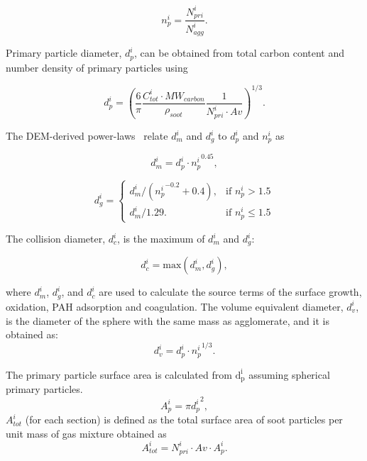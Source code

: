 \begin{equation}
	n^i_p = \frac{N^i_{pri}}{N^i_{agg}}
	\label{eqn:n_p}.
\end{equation}

 Primary particle diameter, ${d^i_p}$, can be obtained from total carbon content and number density of primary particles using

\begin{equation}
	d^i_p = \left(\frac{6}{\pi} \frac{C^i_{tot}\cdot MW_{carbon}}{\rho_{soot}} \frac{1}{N^i_{pri}\cdot Av} \right)^{1/3}.
	\label{eqn:d_p}
\end{equation}

 The DEM-derived power-laws~\citep{Kelesidis2017} relate ${d^i_m}$ and ${d^i_g}$ to ${d^i_p}$ and ${n^i_p}$ as

\begin{equation}
	d^i_{m} = d^i_p\cdot {n^i_p}^{0.45}
	\label{eqn:d_m},
\end{equation}

\begin{equation}
	d^i_g = 
	\left\{
	\begin{array}{lr}
		d^i_m/({n^i_p}^{-0.2}+0.4), & \text{if } n^i_p > 1.5\\
		d^i_m/1.29. & \text{if } n^i_p\leq 1.5
	\end{array}
	\right.
	\label{eqn:d_g}
\end{equation}

 The collision diameter, ${d^i_c}$, is the maximum of ${d^i_{m}}$ and ${d^i_{g}}$:

\begin{equation}
	d^i_c = \mathrm{max}\left(d^i_m, d^i_g\right),
	\label{eqn:d_c}
\end{equation}

   \noindent where ${d^i_{m}}$, ${d^i_{g}}$, and ${d^i_{c}}$ are used to calculate the source terms of the surface growth, oxidation, PAH adsorption and coagulation. The volume equivalent diameter, $d^i_v$, is the diameter of the sphere with the same mass as agglomerate, and it is obtained as:
\begin{equation}
	d^i_v = d^i_p \cdot {n^i_p}^{1/3}
	\label{eqn:d_v}.
\end{equation}

 The primary particle surface area is calculated from $\mathrm{d^i_p}$ assuming spherical primary particles.
\begin{equation}
	A^i_{p} = \pi {d^i_p}^2
	\label{eqn:Ap},
\end{equation}
 $A^i_{tot}$ (for each section) is defined as the total surface area of soot particles per unit mass of gas mixture obtained as
\begin{equation}
	A^i_{tot} = N^i_{pri}\cdot Av\cdot A^i_{p}
	\label{eqn:Atot}.
\end{equation}

